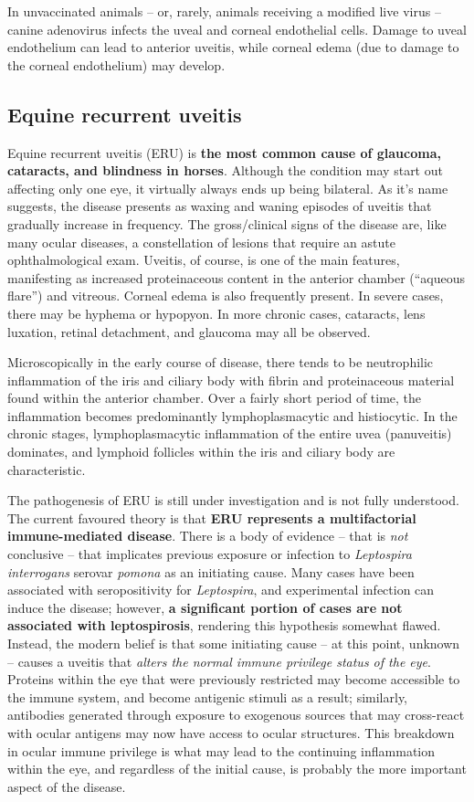 \documentclass[
  openany]{article}
\begin{document}
In unvaccinated animals -- or, rarely, animals receiving a modified live virus -- canine adenovirus infects the uveal and corneal endothelial cells. Damage to uveal endothelium can lead to anterior uveitis, while corneal edema (due to damage to the corneal endothelium) may develop.

\hypertarget{equine-recurrent-uveitis}{%
\subsection{Equine recurrent uveitis}\label{equine-recurrent-uveitis}}

Equine recurrent uveitis (ERU) is \textbf{the most common cause of glaucoma, cataracts, and blindness in horses}. Although the condition may start out affecting only one eye, it virtually always ends up being bilateral. As it's name suggests, the disease presents as waxing and waning episodes of uveitis that gradually increase in frequency. The gross/clinical signs of the disease are, like many ocular diseases, a constellation of lesions that require an astute ophthalmological exam. Uveitis, of course, is one of the main features, manifesting as increased proteinaceous content in the anterior chamber (``aqueous flare'') and vitreous. Corneal edema is also frequently present. In severe cases, there may be hyphema or hypopyon. In more chronic cases, cataracts, lens luxation, retinal detachment, and glaucoma may all be observed.

Microscopically in the early course of disease, there tends to be neutrophilic inflammation of the iris and ciliary body with fibrin and proteinaceous material found within the anterior chamber. Over a fairly short period of time, the inflammation becomes predominantly lymphoplasmacytic and histiocytic. In the chronic stages, lymphoplasmacytic inflammation of the entire uvea (panuveitis) dominates, and lymphoid follicles within the iris and ciliary body are characteristic.

The pathogenesis of ERU is still under investigation and is not fully understood. The current favoured theory is that \textbf{ERU represents a multifactorial immune-mediated disease}. There is a body of evidence -- that is \emph{not} conclusive -- that implicates previous exposure or infection to \emph{Leptospira interrogans} serovar \emph{pomona} as an initiating cause. Many cases have been associated with seropositivity for \emph{Leptospira}, and experimental infection can induce the disease; however, \textbf{a significant portion of cases are not associated with leptospirosis}, rendering this hypothesis somewhat flawed. Instead, the modern belief is that some initiating cause -- at this point, unknown -- causes a uveitis that \emph{alters the normal immune privilege status of the eye}. Proteins within the eye that were previously restricted may become accessible to the immune system, and become antigenic stimuli as a result; similarly, antibodies generated through exposure to exogenous sources that may cross-react with ocular antigens may now have access to ocular structures. This breakdown in ocular immune privilege is what may lead to the continuing inflammation within the eye, and regardless of the initial cause, is probably the more important aspect of the disease.
\end{document}
